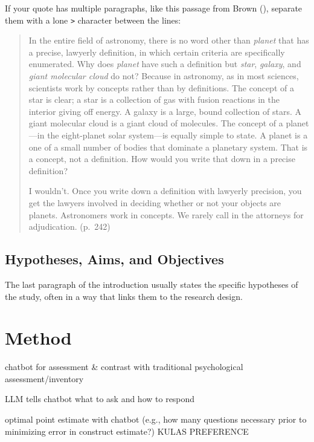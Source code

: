 \documentclass[
  jou,
  floatsintext,
  longtable,
  nolmodern,
  notxfonts,
  notimes,
  colorlinks=true,linkcolor=blue,citecolor=blue,urlcolor=blue]{apa7}
\begin{document}
If your quote has multiple paragraphs, like this passage from Brown
(), separate them with a
lone \texttt{\textgreater{}} character between the lines:

\begin{quote}
In the entire field of astronomy, there is no word other than
\emph{planet} that has a precise, lawyerly definition, in which certain
criteria are specifically enumerated. Why does \emph{planet} have such a
definition but \emph{star}, \emph{galaxy}, and \emph{giant molecular
cloud} do not? Because in astronomy, as in most sciences, scientists
work by concepts rather than by definitions. The concept of a star is
clear; a star is a collection of gas with fusion reactions in the
interior giving off energy. A galaxy is a large, bound collection of
stars. A giant molecular cloud is a giant cloud of molecules. The
concept of a planet---in the eight-planet solar system---is equally
simple to state. A planet is a one of a small number of bodies that
dominate a planetary system. That is a concept, not a definition. How
would you write that down in a precise definition?

I wouldn't. Once you write down a definition with lawyerly precision,
you get the lawyers involved in deciding whether or not your objects are
planets. Astronomers work in concepts. We rarely call in the attorneys
for adjudication. (p.~242)
\end{quote}

\subsection{Hypotheses, Aims, and
Objectives}\label{hypotheses-aims-and-objectives}

The last paragraph of the introduction usually states the specific
hypotheses of the study, often in a way that links them to the research
design.

\section{Method}\label{method}

chatbot for assessment \& contrast with traditional psychological
assessment/inventory

LLM tells chatbot what to ask and how to respond

optimal point estimate with chatbot (e.g., how many questions necessary
prior to minimizing error in construct estimate?) KULAS PREFERENCE
\end{document}

